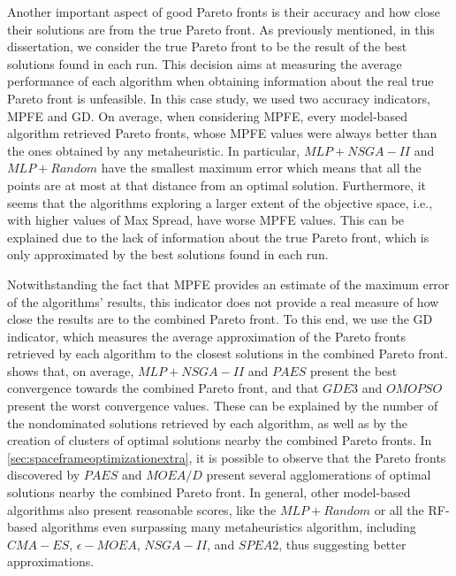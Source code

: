 Another important aspect of good Pareto fronts is their accuracy and how close their solutions are from the true Pareto front. As previously mentioned, in this dissertation, we consider the true Pareto front to be the result of the best solutions found in each run. This decision aims at measuring the average performance of each algorithm when obtaining information about the real true Pareto front is unfeasible. In this case study, we used two accuracy indicators, \ac{MPFE} and \ac{GD}. On average, when considering \ac{MPFE}, every model-based algorithm retrieved Pareto fronts, whose \ac{MPFE} values were always better than the ones obtained by any metaheuristic. In particular, $MLP+NSGA-II$ and $MLP+Random$ have the smallest maximum error which means that all the points are at most at that distance from an optimal solution. Furthermore, it seems that the algorithms exploring a larger extent of the objective space, i.e., with higher values of Max Spread, have worse \ac{MPFE} values. This can be explained due to the lack of information about the true Pareto front, which is only approximated by the best solutions found in each run. 

Notwithstanding the fact that \ac{MPFE} provides an estimate of the maximum error of the algorithms' results, this indicator does not provide a real measure of how close the results are to the combined Pareto front. To this end, we use the \ac{GD} indicator, which measures the average approximation of the Pareto fronts retrieved by each algorithm to the closest solutions in the combined Pareto front.  shows that, on average, $MLP+NSGA-II$ and $PAES$ present the best convergence towards the combined Pareto front, and that $GDE3$ and $OMOPSO$ present the worst convergence values. These can be explained by the number of the nondominated solutions retrieved by each algorithm, as well as by the creation of clusters of optimal solutions nearby the combined Pareto fronts. In \cref{sec:spaceframeoptimizationextra}, it is possible to observe that the Pareto fronts discovered by $PAES$ and $MOEA/D$ present several agglomerations of optimal solutions nearby the combined Pareto front. In general, other model-based algorithms also present reasonable scores, like the $MLP+Random$ or all the \ac{RF}-based algorithms even surpassing many metaheuristics algorithm, including $CMA-ES$, $\epsilon-MOEA$, $NSGA-II$, and $SPEA2$, thus suggesting better approximations.

